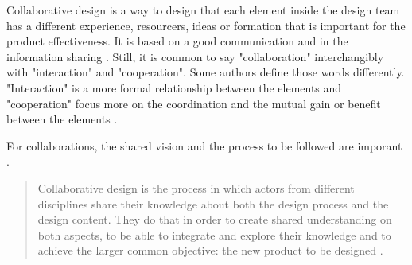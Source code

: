 %
%

Collaborative design is a way to design that each element inside the design team has a different experience, resourcers, ideas or formation that is important for the product effectiveness. It is based on a good communication and in the information sharing \cite{chiu2002organizational}. Still, it is common to say "collaboration" interchangibly with "interaction" and "cooperation". Some authors define those words differently. "Interaction" is a more formal relationship between the elements \cite{kahn1996interdepartmental} and "cooperation" focus more on the coordination and the mutual gain or benefit between the elements \cite{smith1996top}.

For collaborations, the shared vision and the process to be followed are imporant \cite{kleinsmann2006understanding}.

\begin{quote}
    Collaborative design is the process in which actors from different disciplines share their knowledge about both the design process and the design content. They do that in order to create shared understanding on both aspects, to be able to integrate and explore their knowledge and to achieve the larger common objective: the new product to be designed \cite{kleinsmann2006understanding}.
\end{quote}


